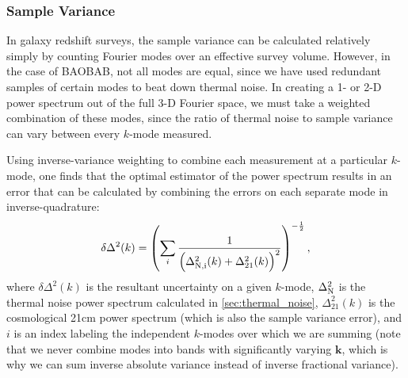 \documentclass[10pt,iop]{emulateapj}
\begin{document}
\subsubsection{Sample Variance}
\label{sec:sample_variance}

In galaxy redshift surveys, the sample variance can be calculated relatively simply by 
counting Fourier modes over an effective survey volume.  However, in the case of BAOBAB,
not all modes are equal, since we have used redundant samples of certain modes to beat down thermal
noise.  In creating a 1- or 2-D power spectrum out of the full 3-D Fourier space,
we must take a weighted combination of these modes, since the ratio of 
thermal noise to sample variance can vary between every $k$-mode measured.

Using inverse-variance weighting to combine each measurement at a particular $k$-mode, 
one finds that the optimal estimator of the power spectrum results in an error
that can be calculated by combining the errors on each separate mode in inverse-quadrature:
\begin{equation}
\delta \Delta^2(k) = \left(\sum\limits_i\frac{1}{\left(\Delta^2_{\rm{N},i}(k)+\Delta^2_{21}(k)\right)^2}\right)^{-\frac12},
\end{equation}
where $\delta\Delta^2(k)$ is the resultant uncertainty on a given $k$-mode, $\Delta^2_{\rm N}$ 
is the thermal noise power spectrum calculated in \ref{sec:thermal_noise}, $\Delta^2_{21}(k)$
is the cosmological 21cm power spectrum (which is also the sample variance error), and $i$
is an index labeling the independent $k$-modes over which we are summing
(note that we never combine modes into bands with significantly varying 
$\mathbf{k}$, which is why we can sum inverse absolute variance instead of 
inverse fractional variance).
\end{document}
